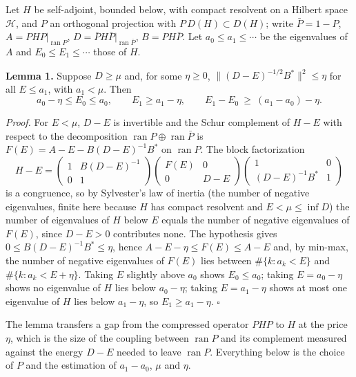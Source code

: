 \documentclass[11pt,a4paper]{article}
\begin{document}
Let \(H\) be self-adjoint, bounded below, with compact resolvent on a
Hilbert space \(\mathcal H\), and \(P\) an orthogonal projection with
\(P\,D(H)\subset D(H)\); write \(\bar P=1-P\),
\(A=PHP|_{\operatorname{ran}P}\),
\(D=\bar PH\bar P|_{\operatorname{ran}\bar P}\), \(B=PH\bar P\). Let
\(a_0\le a_1\le\cdots\) be the eigenvalues of \(A\) and
\(E_0\le E_1\le\cdots\) those of \(H\).

\textbf{Lemma 1.} Suppose \(D\ge\mu\) and, for some \(\eta\ge0\),
\(\|(D-E)^{-1/2}B^*\|^2\le\eta\) for all \(E\le a_1\), with \(a_1<\mu\).
Then \[a_0-\eta\le E_0\le a_0,\qquad E_1\ge a_1-\eta,\qquad
E_1-E_0\ \ge\ (a_1-a_0)-\eta .\]

\emph{Proof.} For \(E<\mu\), \(D-E\) is invertible and the Schur
complement of \(H-E\) with respect to the decomposition
\(\operatorname{ran}P\oplus\operatorname{ran}\bar P\) is
\(F(E)=A-E-B(D-E)^{-1}B^*\) on \(\operatorname{ran}P\). The block
factorization \[H-E=\begin{pmatrix}1&B(D-E)^{-1}\\0&1\end{pmatrix}
\begin{pmatrix}F(E)&0\\0&D-E\end{pmatrix}
\begin{pmatrix}1&0\\(D-E)^{-1}B^*&1\end{pmatrix}\] is a congruence, so
by Sylvester's law of inertia (the number of negative eigenvalues,
finite here because \(H\) has compact resolvent and \(E<\mu\le\inf D\))
the number of eigenvalues of \(H\) below \(E\) equals the number of
negative eigenvalues of \(F(E)\), since \(D-E>0\) contributes none. The
hypothesis gives \(0\le B(D-E)^{-1}B^*\le\eta\), hence
\(A-E-\eta\le F(E)\le A-E\) and, by min-max, the number of negative
eigenvalues of \(F(E)\) lies between \(\#\{k:a_k<E\}\) and
\(\#\{k:a_k<E+\eta\}\). Taking \(E\) slightly above \(a_0\) shows
\(E_0\le a_0\); taking \(E=a_0-\eta\) shows no eigenvalue of \(H\) lies
below \(a_0-\eta\); taking \(E=a_1-\eta\) shows at most one eigenvalue
of \(H\) lies below \(a_1-\eta\), so \(E_1\ge a_1-\eta\). \(\square\)

The lemma transfers a gap from the compressed operator \(PHP\) to \(H\)
at the price \(\eta\), which is the size of the coupling between
\(\operatorname{ran}P\) and its complement measured against the energy
\(D-E\) needed to leave \(\operatorname{ran}P\). Everything below is the
choice of \(P\) and the estimation of \(a_1-a_0\), \(\mu\) and \(\eta\).
\end{document}
